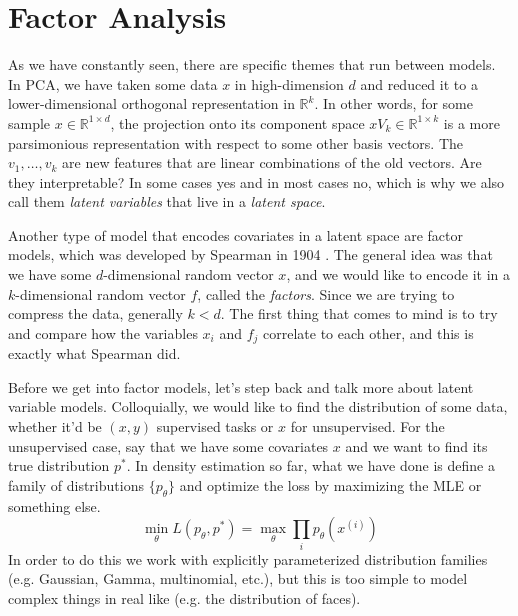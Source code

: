 \section{Factor Analysis} 

  As we have constantly seen, there are specific themes that run between models. In PCA, we have taken some data $x$ in high-dimension $d$ and reduced it to a lower-dimensional orthogonal representation in $\mathbb{R}^k$. In other words, for some sample $x \in \mathbb{R}^{1 \times d}$, the projection onto its component space $x V_k \in \mathbb{R}^{1 \times k}$ is a more parsimonious representation with respect to some other basis vectors. The $v_1, \ldots, v_k$ are new features that are linear combinations of the old vectors. Are they interpretable? In some cases yes and in most cases no, which is why we also call them \textit{latent variables} that live in a \textit{latent space}. 

  Another type of model that encodes covariates in a latent space are factor models, which was developed by Spearman in 1904 \cite{1904spearman}. The general idea was that we have some $d$-dimensional random vector $x$, and we would like to encode it in a $k$-dimensional random vector $f$, called the \textit{factors}. Since we are trying to compress the data, generally $k < d$. The first thing that comes to mind is to try and compare how the variables $x_i$ and $f_j$ correlate to each other, and this is exactly what Spearman did. 

  Before we get into factor models, let's step back and talk more about latent variable models. Colloquially, we would like to find the distribution of some data, whether it'd be $(x, y)$ supervised tasks or $x$ for unsupervised. For the unsupervised case, say that we have some covariates $x$ and we want to find its true distribution $p^\ast$. In density estimation so far, what we have done is define a family of distributions $\{p_\theta\}$ and optimize the loss by maximizing the MLE or something else. 
  \begin{equation}
    \min_\theta L(p_\theta, p^\ast) = \max_\theta \prod_{i} p_\theta(x^{(i)})
  \end{equation}
  In order to do this we work with explicitly parameterized distribution families (e.g. Gaussian, Gamma, multinomial, etc.), but this is too simple to model complex things in real like (e.g. the distribution of faces).

